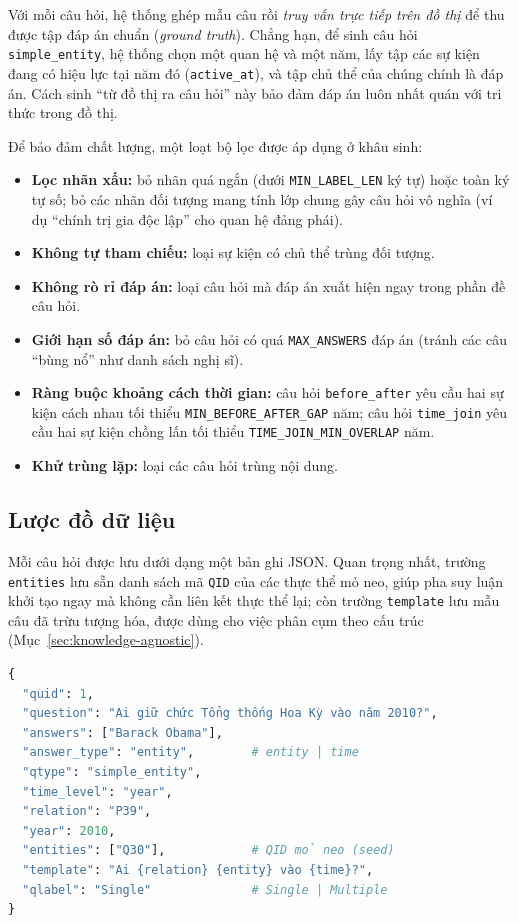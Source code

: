 Với mỗi câu hỏi, hệ thống ghép mẫu câu rồi \emph{truy vấn trực tiếp trên đồ thị} để thu được tập
đáp án chuẩn (\textit{ground truth}). Chẳng hạn, để sinh câu hỏi \texttt{simple\_entity}, hệ thống
chọn một quan hệ và một năm, lấy tập các sự kiện đang có hiệu lực tại năm đó (\texttt{active\_at}),
và tập chủ thể của chúng chính là đáp án. Cách sinh ``từ đồ thị ra câu hỏi'' này bảo đảm đáp án luôn
nhất quán với tri thức trong đồ thị.

Để bảo đảm chất lượng, một loạt bộ lọc được áp dụng ở khâu sinh:

\begin{itemize}
  \item \textbf{Lọc nhãn xấu:} bỏ nhãn quá ngắn (dưới \texttt{MIN\_LABEL\_LEN} ký tự) hoặc toàn ký
  tự số; bỏ các nhãn đối tượng mang tính lớp chung gây câu hỏi vô nghĩa (ví dụ ``chính trị gia độc
  lập'' cho quan hệ đảng phái).
  \item \textbf{Không tự tham chiếu:} loại sự kiện có chủ thể trùng đối tượng.
  \item \textbf{Không rò rỉ đáp án:} loại câu hỏi mà đáp án xuất hiện ngay trong phần đề câu hỏi.
  \item \textbf{Giới hạn số đáp án:} bỏ câu hỏi có quá \texttt{MAX\_ANSWERS} đáp án (tránh các câu
  ``bùng nổ'' như danh sách nghị sĩ).
  \item \textbf{Ràng buộc khoảng cách thời gian:} câu hỏi \texttt{before\_after} yêu cầu hai sự
  kiện cách nhau tối thiểu \texttt{MIN\_BEFORE\_AFTER\_GAP} năm; câu hỏi \texttt{time\_join} yêu
  cầu hai sự kiện chồng lấn tối thiểu \texttt{TIME\_JOIN\_MIN\_OVERLAP} năm.
  \item \textbf{Khử trùng lặp:} loại các câu hỏi trùng nội dung.
\end{itemize}

\subsection{Lược đồ dữ liệu}
\label{sec:schema}

Mỗi câu hỏi được lưu dưới dạng một bản ghi JSON. Quan trọng nhất, trường \texttt{entities} lưu sẵn
danh sách mã \texttt{QID} của các thực thể mỏ neo, giúp pha suy luận khởi tạo ngay mà không cần
liên kết thực thể lại; còn trường \texttt{template} lưu mẫu câu đã trừu tượng hóa, được dùng cho
việc phân cụm theo cấu trúc (Mục~\ref{sec:knowledge-agnostic}).

\begin{lstlisting}[language=Python,caption={Một bản ghi câu hỏi trong CronQ-VN.},label=lst:schema]
{
  "quid": 1,
  "question": "Ai giữ chức Tổng thống Hoa Kỳ vào năm 2010?",
  "answers": ["Barack Obama"],
  "answer_type": "entity",        # entity | time
  "qtype": "simple_entity",
  "time_level": "year",
  "relation": "P39",
  "year": 2010,
  "entities": ["Q30"],            # QID mỏ neo (seed)
  "template": "Ai {relation} {entity} vào {time}?",
  "qlabel": "Single"              # Single | Multiple
}
\end{lstlisting}

